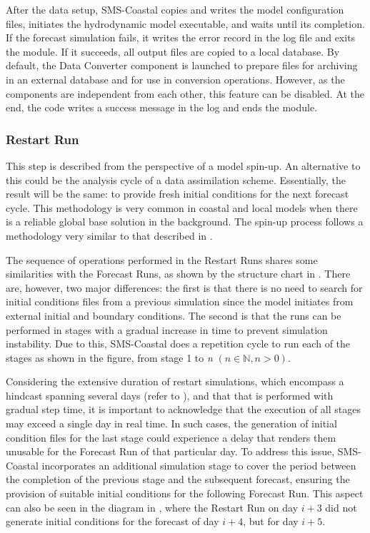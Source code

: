 After the data setup, SMS-Coastal copies and writes the model configuration files, initiates the hydrodynamic model executable, and waits until its completion. If the forecast simulation fails, it writes the error record in the log file and exits the module. If it succeeds, all output files are copied to a local database. By default, the Data Converter component is launched to prepare files for archiving in an external database and for use in conversion operations. However, as the components are independent from each other, this feature can be disabled. At the end, the code writes a success message in the log and ends the module.

\subsubsection{Restart Run}
This step is described from the perspective of a model spin-up. An alternative to this could be the analysis cycle of a data assimilation scheme. Essentially, the result will be the same: to provide fresh initial conditions for the next forecast cycle. This methodology is very common in coastal and local models when there is a reliable global base solution in the background. The spin-up process follows a methodology very similar to that described in \textcite{leitao2005modelling}.

The sequence of operations performed in the Restart Runs shares some similarities with the Forecast Runs, as shown by the structure chart in . There are, however, two major differences: the first is that there is no need to search for initial conditions files from a previous simulation since the model initiates from external initial and boundary conditions. The second is that the runs can be performed in stages with a gradual increase in time to prevent simulation instability. Due to this, SMS-Coastal does a repetition cycle to run each of the stages as shown in the figure, from stage 1 to \emph{n} $(n \in \mathbb{N}, n > 0)$.

Considering the extensive duration of restart simulations, which encompass a hindcast spanning several days (refer to ), and that that is performed with gradual step time, it is important to acknowledge that the execution of all stages may exceed a single day in real time. In such cases, the generation of initial condition files for the last stage could experience a delay that renders them unusable for the Forecast Run of that particular day. To address this issue, SMS-Coastal incorporates an additional simulation stage to cover the period between the completion of the previous stage and the subsequent forecast, ensuring the provision of suitable initial conditions for the following Forecast Run. This aspect can also be seen in the diagram in , where the Restart Run on day $i + 3$ did not generate initial conditions for the forecast of day $i + 4$, but for day $i + 5$.

